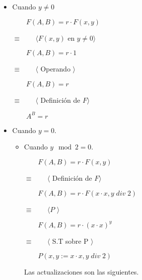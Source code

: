 \documentclass[hidelinks]{article}
\begin{document}
\begin{enumerate}
	      \begin{itemize}
		      \item Cuando $y \neq 0$\par

		            $\qquad F(A,B) = r \cdot F(x,y)$\par
		            $\equiv \qquad \langle F(x,y)$ en $ y \neq 0 \rangle$\par
		            $\qquad F(A,B) = r \cdot 1$\par
		            $\equiv \qquad \langle$ Operando $\rangle$\par
		            $\qquad F(A,B) = r$\par
		            $\equiv \qquad \langle$ Definición de $F\rangle$\par
		            $\qquad A^B = r$\par

		      \item Cuando $y = 0$.\par

		            \begin{itemize}
			            \item Cuando $y \mod 2 = 0$.\par
			                  $\qquad F(A,B) = r \cdot F(x,y)$\par
			                  $\equiv \qquad \langle $ Definición de $ F \rangle$\par
			                  $\qquad F(A,B) = r \cdot F(x \cdot x, y \; div \; 2)$\par
			                  $\equiv \qquad \langle P$  $\rangle$\par
			                  $\qquad F(A,B) = r \cdot (x \cdot x)^y$\par
			                  $\equiv \qquad \langle $ S.T sobre P $\rangle$\par
			                  $\qquad P(x,y := x \cdot x, y \; div \; 2)$\par
			                  Las actualizaciones son las siguientes.\par


\end{itemize}
\end{itemize}
\end{enumerate}
\end{document}

